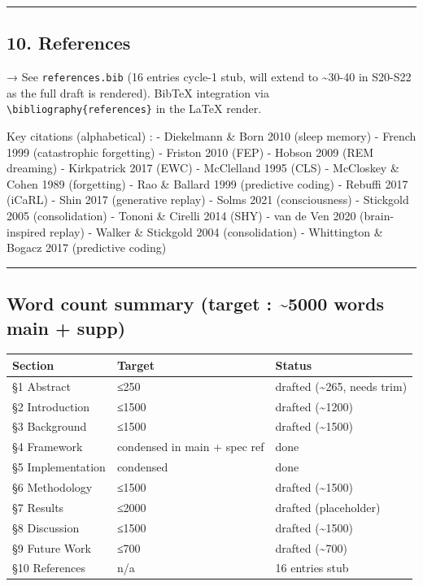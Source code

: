 \documentclass[
]{article}
\newcounter{none} %
\begin{document}
\begin{center}\rule{0.5\linewidth}{0.5pt}\end{center}

\subsection{10. References}\label{references}

→ See \texttt{references.bib} (16 entries cycle-1 stub, will extend to
\textasciitilde30-40 in S20-S22 as the full draft is rendered). BibTeX
integration via \texttt{\textbackslash{}bibliography\{references\}} in
the LaTeX render.

Key citations (alphabetical) : - Diekelmann \& Born 2010 (sleep memory)
- French 1999 (catastrophic forgetting) - Friston 2010 (FEP) - Hobson
2009 (REM dreaming) - Kirkpatrick 2017 (EWC) - McClelland 1995 (CLS) -
McCloskey \& Cohen 1989 (forgetting) - Rao \& Ballard 1999 (predictive
coding) - Rebuffi 2017 (iCaRL) - Shin 2017 (generative replay) - Solms
2021 (consciousness) - Stickgold 2005 (consolidation) - Tononi \&
Cirelli 2014 (SHY) - van de Ven 2020 (brain-inspired replay) - Walker \&
Stickgold 2004 (consolidation) - Whittington \& Bogacz 2017 (predictive
coding)

\begin{center}\rule{0.5\linewidth}{0.5pt}\end{center}

\subsection{Word count summary (target : \textasciitilde5000 words main
+ supp)}\label{word-count-summary-target-5000-words-main-supp}

{\def\LTcaptype{none} %
\begin{longtable}[]{@{}lll@{}}
\toprule\noalign{}
Section & Target & Status \\
\midrule\noalign{}
\endhead
\bottomrule\noalign{}
\endlastfoot
§1 Abstract & ≤250 & drafted (\textasciitilde265, needs trim) \\
§2 Introduction & ≤1500 & drafted (\textasciitilde1200) \\
§3 Background & ≤1500 & drafted (\textasciitilde1500) \\
§4 Framework & condensed in main + spec ref & done \\
§5 Implementation & condensed & done \\
§6 Methodology & ≤1500 & drafted (\textasciitilde1500) \\
§7 Results & ≤2000 & drafted (placeholder) \\
§8 Discussion & ≤1500 & drafted (\textasciitilde1500) \\
§9 Future Work & ≤700 & drafted (\textasciitilde700) \\
§10 References & n/a & 16 entries stub \\
\end{longtable}
}
\end{document}
